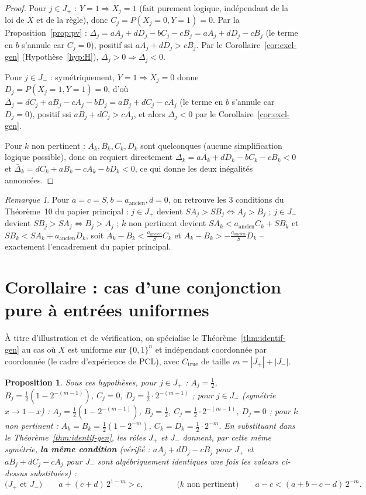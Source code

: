 \documentclass[12pt,a4paper]{article}
\newtheorem{proposition}[theorem]{Proposition}
\theoremstyle{remark}
\newtheorem{remark}[theorem]{Remarque}
\begin{document}
\begin{proof}
Pour $j\in J_+$ : $Y{=}1\Rightarrow X_j{=}1$ (fait purement logique,
indépendant de la loi de $X$ et de la règle), donc $C_j=P(X_j{=}0,Y{=}1)=0$.
Par la Proposition~\ref{prop:pv} : $\Delta_j=aA_j+dD_j-bC_j-cB_j=aA_j+dD_j-cB_j$
(le terme en $b$ s'annule car $C_j=0$), positif ssi $aA_j+dD_j>cB_j$. Par le
Corollaire~\ref{cor:excl-gen} (Hypothèse~\ref{hyp:H}), $\Delta_j>0\Rightarrow\bar\Delta_j<0$.

Pour $j\in J_-$ : symétriquement, $Y{=}1\Rightarrow X_j{=}0$ donne
$D_j=P(X_j{=}1,Y{=}1)=0$, d'où $\bar\Delta_j=dC_j+aB_j-cA_j-bD_j=aB_j+dC_j-cA_j$
(le terme en $b$ s'annule car $D_j=0$), positif ssi $aB_j+dC_j>cA_j$, et
alors $\Delta_j<0$ par le Corollaire~\ref{cor:excl-gen}.

Pour $k$ non pertinent : $A_k,B_k,C_k,D_k$ sont quelconques (aucune
simplification logique possible), donc on requiert directement
$\Delta_k=aA_k+dD_k-bC_k-cB_k<0$ et $\bar\Delta_k=dC_k+aB_k-cA_k-bD_k<0$, ce
qui donne les deux inégalités annoncées.
\end{proof}

\begin{remark}
Pour $a=c=S,b=a_{\mathrm{ancien}},d=0$, on retrouve les 3 conditions du
Théorème~10 du papier principal : $j\in J_+$ devient $SA_j>SB_j\iff A_j>B_j$ ;
$j\in J_-$ devient $SB_j>SA_j\iff B_j>A_j$ ; $k$ non pertinent devient
$SA_k<a_{\mathrm{ancien}}C_k+SB_k$ et $SB_k<SA_k+a_{\mathrm{ancien}}D_k$, soit
$A_k-B_k<\tfrac{a_{\mathrm{ancien}}}{S}C_k$ et $A_k-B_k>-\tfrac{a_{\mathrm{ancien}}}{S}D_k$
-- exactement l'encadrement du papier principal.
\end{remark}

\section{Corollaire : cas d'une conjonction pure à entrées uniformes}

À titre d'illustration et de vérification, on spécialise le
Théorème~\ref{thm:identif-gen} au cas où $X$ est uniforme sur $\{0,1\}^n$ et
indépendant coordonnée par coordonnée (le cadre d'expérience de PCL), avec
$C_{\mathrm{true}}$ de taille $m=|J_+|+|J_-|$.

\begin{proposition}\label{prop:uniforme}
Sous ces hypothèses, pour $j\in J_+$ : $A_j=\tfrac12$,
$B_j=\tfrac12(1-2^{-(m-1)})$, $C_j=0$, $D_j=\tfrac12\cdot2^{-(m-1)}$ ; pour
$j\in J_-$ (symétrie $x\to1-x$) : $A_j=\tfrac12(1-2^{-(m-1)})$, $B_j=\tfrac12$,
$C_j=\tfrac12\cdot2^{-(m-1)}$, $D_j=0$ ; pour $k$ non pertinent :
$A_k=B_k=\tfrac12(1-2^{-m})$, $C_k=D_k=\tfrac12\cdot2^{-m}$. En substituant
dans le Théorème~\ref{thm:identif-gen}, les rôles $J_+$ et $J_-$ donnent, par
cette même symétrie, \textbf{la même condition} (vérifié : $aA_j+dD_j-cB_j$
pour $J_+$ et $aB_j+dC_j-cA_j$ pour $J_-$ sont algébriquement identiques une
fois les valeurs ci-dessus substituées) :
\[
  \text{($J_+$ et $J_-$)}\qquad a+(c+d)\,2^{1-m}>c,
  \qquad\qquad
  \text{($k$ non pertinent)}\qquad a-c<(a+b-c-d)\,2^{-m}.
\]
\end{proposition}
\end{document}
